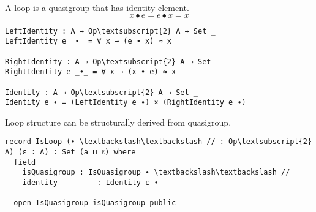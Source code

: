 A loop is a quasigroup that has identity element.
\begin{equation}\label{eq_lineslope}
x ∙ e = e ∙ x = x
\end{equation}
\begin{center}
\begin{Verbatim}[commandchars=\\\{\},samepage=true]
LeftIdentity : A → Op\textsubscript{2} A → Set _
LeftIdentity e _∙_ = ∀ x → (e ∙ x) ≈ x

RightIdentity : A → Op\textsubscript{2} A → Set _
RightIdentity e _∙_ = ∀ x → (x ∙ e) ≈ x

Identity : A → Op\textsubscript{2} A → Set _
Identity e ∙ = (LeftIdentity e ∙) × (RightIdentity e ∙)
\end{Verbatim}
\end{center}
Loop structure can be structurally derived from quasigroup.
\begin{center}
\begin{Verbatim}[commandchars=\\\{\},samepage=true]
record IsLoop (∙ \textbackslash\textbackslash // : Op\textsubscript{2} A) (ε : A) : Set (a ⊔ ℓ) where
  field
    isQuasigroup : IsQuasigroup ∙ \textbackslash\textbackslash //
    identity         : Identity ε ∙

  open IsQuasigroup isQuasigroup public
\end{Verbatim}
\end{center}
\begin{comment}
  identity\textsuperscript{l} : LeftIdentity ε ∙
  identity\textsuperscript{l} = proj\textsubscript{1} identity

  identity\textsuperscript{r} : RightIdentity ε ∙
  identity\textsuperscript{r} = proj\textsubscript{2} identity
\end{comment}

